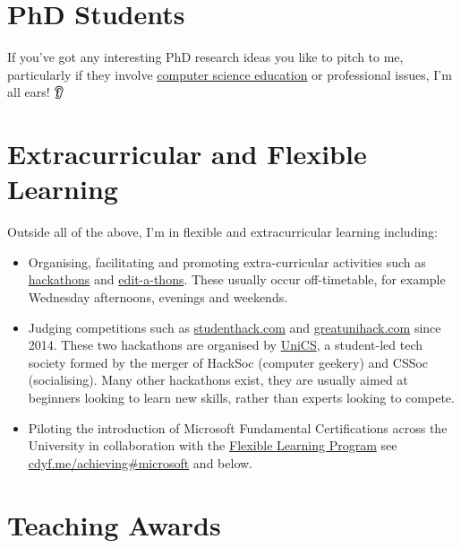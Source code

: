 \documentclass[
  12pt,
]{book}
\providecommand{\tightlist}{%
  \setlength{\itemsep}{0pt}\setlength{\parskip}{0pt}}
\begin{document}
\hypertarget{phds}{%
\section{PhD Students}\label{phds}}

If you've got any interesting PhD research ideas you like to pitch to me, particularly if they involve \href{https://sigcse.cs.manchester.ac.uk}{computer science education} or professional issues, I'm all ears! 👂

\hypertarget{extra}{%
\section{Extracurricular and Flexible Learning}\label{extra}}

Outside all of the above, I'm in flexible and extracurricular learning including:

\begin{itemize}
\tightlist
\item
  Organising, facilitating and promoting extra-curricular activities such as \href{https://en.wikipedia.org/wiki/Hackathon}{hackathons} \citep{Briscoe, Warner2017} and \href{https://en.wikipedia.org/wiki/Edit-a-thon}{edit-a-thons}. \citep{goodbadugly, troubled, findingada2019} These usually occur off-timetable, for example Wednesday afternoons, evenings and weekends.
\item
  Judging competitions such as \href{https://www.studenthack.com}{studenthack.com} and \href{https://greatunihack.com}{greatunihack.com} since 2014. These two hackathons are organised by \href{https://www.unicsmcr.com/}{UniCS}, a student-led tech society formed by the merger of HackSoc (computer geekery) and CSSoc (socialising). Many other hackathons exist, they are usually aimed at beginners looking to learn new skills, rather than experts looking to compete. \citep{Briscoe, hafb}
\item
  Piloting the introduction of Microsoft Fundamental Certifications across the University in collaboration with the \href{https://www.manchester.ac.uk/discover/teaching-and-learning-excellence/flexible-learning/}{Flexible Learning Program} see \href{https://www.cdyf.me/achieving\#microsoft}{cdyf.me/achieving\#microsoft} and below. \citep{georgepettifer}
\end{itemize}

\hypertarget{awards}{%
\section{Teaching Awards}\label{awards}}
\end{document}
